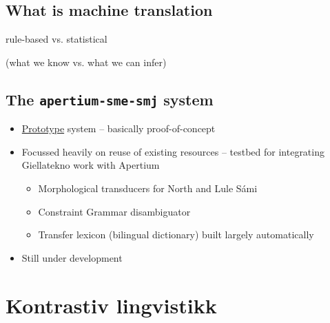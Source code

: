 \documentclass[a4paper,english,12pt]{article}
\begin{document}
\begin{spacing}{1.0}
 
\subsection{What is machine translation}

  \begin{centering}

    {\Large rule-based vs. statistical}

    (what we know vs. what we can infer)

  \end{centering}

 


 
\subsection{The {\tt apertium-sme-smj} system}

\begin{itemize}
  \item \underline{Prototype} system -- basically proof-of-concept
  \item Focussed heavily on reuse of existing resources -- testbed for 
    integrating Giellatekno work with Apertium
  \begin{itemize}
    \item Morphological transducers for North and Lule Sámi
    \item Constraint Grammar disambiguator
    \item Transfer lexicon (bilingual dictionary) built largely automatically
  \end{itemize}
  \item Still under development
\end{itemize}

 



\section{Kontrastiv lingvistikk} 

\end{spacing}
\end{document}
